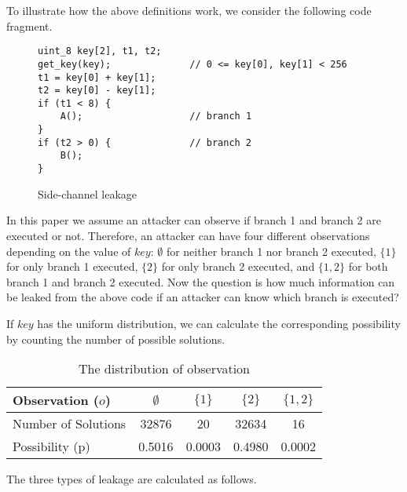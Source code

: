 To illustrate how the above definitions work, we consider the following code
fragment.

\begin{figure}[h!]
    \centering
    \begin{lstlisting}[xleftmargin=.03\textwidth,xrightmargin=.01\textwidth]
uint_8 key[2], t1, t2;
get_key(key);              // 0 <= key[0], key[1] < 256
t1 = key[0] + key[1];
t2 = key[0] - key[1];
if (t1 < 8) {
    A();                   // branch 1
}
if (t2 > 0) {              // branch 2
    B();
}
\end{lstlisting}
    \caption{Side-channel leakage}
    \label{fig:side-channel}
\end{figure}
In this paper we assume an attacker can observe if branch 1 and branch 2 are
executed or not. Therefore, an attacker can have four different observations
depending on the value of $\mathit{key}$: $\emptyset$ for neither branch 1 nor
branch 2 executed, $\{1\}$ for only branch 1 executed, $\{2\}$ for only branch 2
executed, and $\{1, 2\}$ for both branch 1 and branch 2 executed. Now the
question is how much information can be leaked from the above code if an
attacker can know which branch is executed?

If $key$ has the uniform distribution, we can calculate the corresponding
possibility by counting the number of possible solutions.
\begin{table}[ht]
    \centering
    \caption{The distribution of observation}\label{shtable}
    \begin{tabular}{l|cccc}
        \hline
        Observation ($o$)   & $\emptyset$ & ${\{1\}}$ & ${\{2\}}$ & ${\{1, 2\}}$ \\ \hline
        Number of Solutions & 32876       & 20        & 32634     & 16           \\ \hline
        Possibility (p)     & 0.5016      & 0.0003    & 0.4980    & 0.0002       \\
        \hline
    \end{tabular}
\end{table}


The three types of leakage are calculated as follows.

